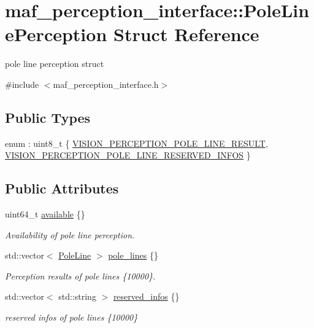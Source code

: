 \hypertarget{structmaf__perception__interface_1_1PoleLinePerception}{}\section{maf\+\_\+perception\+\_\+interface\+:\+:Pole\+Line\+Perception Struct Reference}
\label{structmaf__perception__interface_1_1PoleLinePerception}


pole line perception struct  




{\ttfamily \#include $<$maf\+\_\+perception\+\_\+interface.\+h$>$}

\subsection*{Public Types}
\begin{DoxyCompactItemize}
\item 
enum \+: uint8\+\_\+t \{ \hyperlink{structmaf__perception__interface_1_1PoleLinePerception_a1f64c2d0c8b62681041cae3bec29b634a91cd6cee1ba1e1ece4a779caa2da4cd0}{V\+I\+S\+I\+O\+N\+\_\+\+P\+E\+R\+C\+E\+P\+T\+I\+O\+N\+\_\+\+P\+O\+L\+E\+\_\+\+L\+I\+N\+E\+\_\+\+R\+E\+S\+U\+LT}, 
\hyperlink{structmaf__perception__interface_1_1PoleLinePerception_a1f64c2d0c8b62681041cae3bec29b634aa088421e663745e055367d566e32f9f1}{V\+I\+S\+I\+O\+N\+\_\+\+P\+E\+R\+C\+E\+P\+T\+I\+O\+N\+\_\+\+P\+O\+L\+E\+\_\+\+L\+I\+N\+E\+\_\+\+R\+E\+S\+E\+R\+V\+E\+D\+\_\+\+I\+N\+F\+OS}
 \}
\end{DoxyCompactItemize}
\subsection*{Public Attributes}
\begin{DoxyCompactItemize}
\item 
uint64\+\_\+t \hyperlink{structmaf__perception__interface_1_1PoleLinePerception_a7136fcbe3d1f9689edd4728bb1eed6dc}{available} \{\}
\begin{DoxyCompactList}\small\item\em Availability of pole line perception. \end{DoxyCompactList}\item 
std\+::vector$<$ \hyperlink{structmaf__perception__interface_1_1PoleLine}{Pole\+Line} $>$ \hyperlink{structmaf__perception__interface_1_1PoleLinePerception_a605cbcc25ec235dd396a7c9756f82fa2}{pole\+\_\+lines} \{\}
\begin{DoxyCompactList}\small\item\em Perception results of pole lines \{10000\}. \end{DoxyCompactList}\item 
std\+::vector$<$ std\+::string $>$ \hyperlink{structmaf__perception__interface_1_1PoleLinePerception_af90c2db0e686a7242f31682a0d1877c8}{reserved\+\_\+infos} \{\}
\begin{DoxyCompactList}\small\item\em reserved infos of pole lines \{10000\} \end{DoxyCompactList}\end{DoxyCompactItemize}


